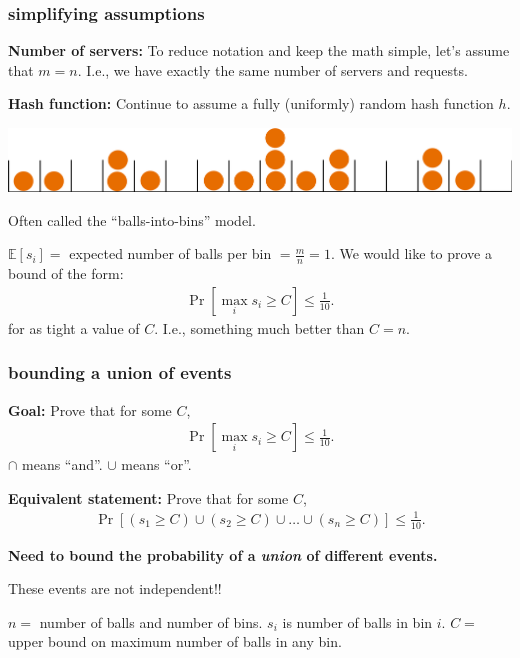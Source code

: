 \documentclass[handout,compress]{beamer}
\newcommand{\E}{\mathbb{E}}
\begin{document}
\begin{frame}
	\frametitle{simplifying assumptions}
	\textbf{Number of servers:} To reduce notation and keep the math simple, let's assume that $m = n$. I.e., we have exactly the same number of servers and requests. 
	
	\textbf{Hash function:} Continue to assume a fully (uniformly) random hash function $h$.
	
	\begin{center}
		\includegraphics[width=.8\textwidth]{balls_into_bins.png}
		
		Often called the ``balls-into-bins'' model. 
	\end{center}
	
	$\E[s_i] = $ expected number of balls per bin $=\frac{m}{n} = 1$. We would like to prove a bound of the form:
	\begin{align*}
		\Pr[\max_i s_i \geq C] \leq \frac{1}{10}. 
	\end{align*}
	for as tight a value of $C$. I.e., something much better than $C = n$. 
\end{frame}

\begin{frame}
	\frametitle{bounding a union of events}
	\textbf{Goal:} Prove that for some $C$,
	\begin{align*}
		\Pr[\max_i s_i \geq C] \leq \frac{1}{10}. 
	\end{align*}
	 $\cap$ means ``and''. $\cup$ means ``or''.
	
	\textbf{Equivalent statement:} Prove that for some $C$, 
	\begin{align*}
		\Pr[(s_1 \geq C) \cup (s_2 \geq C) \cup \ldots \cup (s_n \geq C)] \leq \frac{1}{10}. 
	\end{align*}
	
	\begin{center}
		\textbf{\alert{Need to bound the probability of a \emph{union} of different events.}}
		
		These events are not independent!!
	\end{center}
	
	\vspace{1em}
	\begin{block}{\vspace*{-3ex}}
		\small $n = $ number of balls and number of bins. $s_i$ is number of balls in bin $i$. $C =$ upper bound on maximum number of balls in any bin.
	\end{block}
\end{frame}
\end{document}
